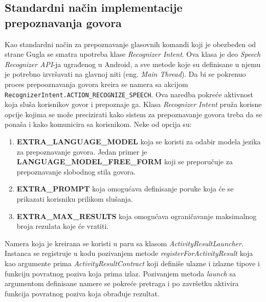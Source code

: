 \documentclass[struktura.tex]{subfiles}
\begin{document}
\subsection{Standardni način implementacije prepoznavanja govora}
Kao standardni način za prepoznavanje glasovnih komandi koji je obezbeđen od strane Gugla se smatra upotreba klase \textit{Recognizer Intent}. Ova klasa je deo \textit{Speech Recognizer API}-ja ugrađenog u Android, a sve metode koje su definisane u njemu je potrebno izvršavati na glavnoj niti (eng. \textit{Main Thread}). Da bi se pokrenuo proces prepooznavanja govora kreira se namera sa akcijom \verb|RecognizerIntent.ACTION_RECOGNIZE_SPEECH|. Ova naredba pokreće aktivnost koja sluša korisnikov govor i prepoznaje ga. Klasa \textit{Recognizer Intent} pruža korisne opcije kojima se može precizirati kako sistem za prepoznavanje govora treba da se ponaša i kako komunicira sa korisnikom. Neke od opcija su:
\begin{enumerate}
    \item \textbf{EXTRA\_LANGUAGE\_MODEL} koja se koristi za odabir modela jezika za prepoznavanje govora. Jedan primer je \textbf{LANGUAGE\_MODEL\_FREE\_FORM} koji se preporučuje za prepoznavanje slobodnog stila govora.
    \item \textbf{EXTRA\_PROMPT} koja omogućava definisanje poruke koja će se prikazati korisniku prilikom slušanja.
    \item \textbf{EXTRA\_MAX\_RESULTS} koja omogućava ograničavanje maksimalnog broja rezulata koje će vratiti.
\end{enumerate}

Namera koja je kreirana se koristi u paru sa klasom \textit{ActivityResultLauncher}. Instanca se registruje u kodu pozivanjem metode \textit{registerForActivityResult} koja kao argumente prima \textit{ActivityResultContract} koji definiše ulazne i izlazne tipove i funkciju povratnog poziva koja prima izlaz. Pozivanjem metoda \textit{launch} sa argumentom definisane namere se pokreće pretraga i po završetku aktivira funkcija povratnog poziva koja obrađuje rezultat.
\end{document}
